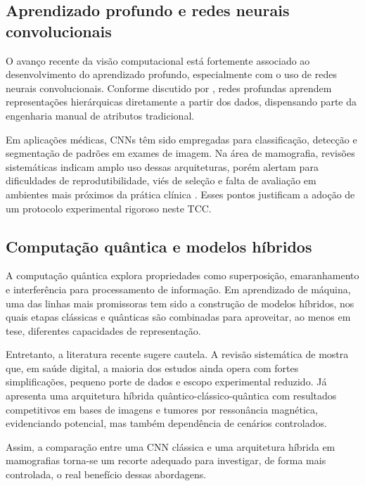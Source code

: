 \documentclass[
    12pt,
    openright,
    oneside,
    a4paper,
    english,
    brazil
]{abntex2}
\begin{document}
\subsection{Aprendizado profundo e redes neurais convolucionais}

O avanço recente da visão computacional está fortemente associado ao desenvolvimento do aprendizado profundo, especialmente com o uso de redes neurais convolucionais. Conforme discutido por , redes profundas aprendem representações hierárquicas diretamente a partir dos dados, dispensando parte da engenharia manual de atributos tradicional.

Em aplicações médicas, CNNs têm sido empregadas para classificação, detecção e segmentação de padrões em exames de imagem. Na área de mamografia, revisões sistemáticas indicam amplo uso dessas arquiteturas, porém alertam para dificuldades de reprodutibilidade, viés de seleção e falta de avaliação em ambientes mais próximos da prática clínica \cite{Bhalla2023MammographyReview}. Esses pontos justificam a adoção de um protocolo experimental rigoroso neste TCC.

\subsection{Computação quântica e modelos híbridos}

A computação quântica explora propriedades como superposição, emaranhamento e interferência para processamento de informação. Em aprendizado de máquina, uma das linhas mais promissoras tem sido a construção de modelos híbridos, nos quais etapas clássicas e quânticas são combinadas para aproveitar, ao menos em tese, diferentes capacidades de representação.

Entretanto, a literatura recente sugere cautela. A revisão sistemática de  mostra que, em saúde digital, a maioria dos estudos ainda opera com fortes simplificações, pequeno porte de dados e escopo experimental reduzido. Já  apresenta uma arquitetura híbrida quântico-clássico-quântica com resultados competitivos em bases de imagens e tumores por ressonância magnética, evidenciando potencial, mas também dependência de cenários controlados.

Assim, a comparação entre uma CNN clássica e uma arquitetura híbrida em mamografias torna-se um recorte adequado para investigar, de forma mais controlada, o real benefício dessas abordagens.
\end{document}
